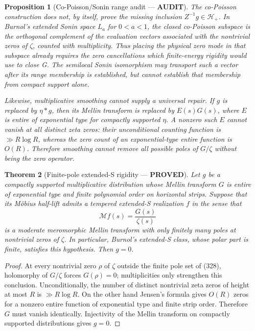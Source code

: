 \documentclass[11pt]{article}
\newtheorem{theorem}{Theorem}
\newtheorem{proposition}[theorem]{Proposition}
\newcommand{\PROVED}{\textcolor{green!45!black}{\textbf{PROVED}}}
\newcommand{\AUDIT}{\textcolor{orange!75!black}{\textbf{AUDIT}}}
\begin{document}
\begin{proposition}[Co-Poisson/Sonin range audit --- \AUDIT]
The co-Poisson construction does not, by itself, prove the missing inclusion
$Z^{-1}g\in\mathcal H_+$.  In Burnol's extended Sonin space $L_a$ for
$0<a<1$, the closed co-Poisson subspace is the orthogonal complement of the
evaluation vectors associated with the nontrivial zeros of $\zeta$, counted
with multiplicity.  Thus placing the physical zero mode in that subspace
already requires the zero cancellations which finite-energy rigidity would
use to close G.  The semilocal Sonin isomorphism may transport such a vector
after its range membership is established, but cannot establish that
membership from compact support alone.

Likewise, multiplicative smoothing cannot supply a universal repair.  If
$g$ is replaced by $\eta*g$, then its Mellin transform is replaced by
$E(s)G(s)$, where $E$ is entire of exponential type for compactly supported
$\eta$.  A nonzero such $E$ cannot vanish at all distinct zeta zeros: their
unconditional counting function is $\gg R\log R$, whereas the zero count of
an exponential-type entire function is $O(R)$.  Therefore smoothing cannot
remove all possible poles of $G/\zeta$ without being the zero operator.
\end{proposition}

\begin{theorem}[Finite-pole extended-S rigidity --- \PROVED]
Let $g$ be a compactly supported multiplicative distribution whose Mellin
transform $G$ is entire of exponential type and finite polynomial order on
horizontal strips.  Suppose that its M\"obius half-lift admits a tempered
extended-S realization $f$ in the sense that
\begin{equation}
 \mathcal Mf(s)=\frac{G(s)}{\zeta(s)}                 \tag{328}
\end{equation}
is a moderate meromorphic Mellin transform with only finitely many poles at
nontrivial zeros of $\zeta$.  In particular, Burnol's extended-S class,
whose polar part is finite, satisfies this hypothesis.  Then $g=0$.
\end{theorem}

\begin{proof}
At every nontrivial zero $\rho$ of $\zeta$ outside the finite pole set of
(328), holomorphy of $G/\zeta$ forces $G(\rho)=0$; multiplicities only
strengthen this conclusion.  Unconditionally, the number of distinct
nontrivial zeta zeros of height at most $R$ is $\gg R\log R$.  On the other
hand Jensen's formula gives $O(R)$ zeros for a nonzero entire function of
exponential type and finite strip order.  Therefore $G$ must vanish
identically.  Injectivity of the Mellin transform on compactly supported
distributions gives $g=0$.
\end{proof}
\end{document}
